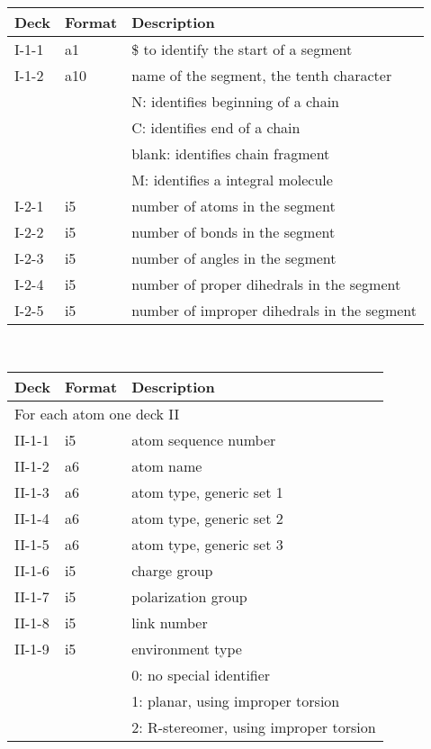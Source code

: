 \begin{center}
\begin{tabular*}{150mm}{p{12mm}p{12mm}l}
\hline\hline
Deck  & Format & Description \\ \hline
I-1-1 & a1     & \$ to identify the start of a segment \\
I-1-2 & a10    & name of the segment, the tenth character\\
      &        & N: identifies beginning of a chain\\
      &        & C: identifies end of a chain\\
      &        & blank: identifies chain fragment\\
      &        & M: identifies a integral molecule\\
I-2-1 & i5     & number of atoms in the segment\\
I-2-2 & i5     & number of bonds in the segment\\
I-2-3 & i5     & number of angles in the segment\\
I-2-4 & i5     & number of proper dihedrals in the segment\\
I-2-5 & i5     & number of improper dihedrals in the segment\\
\hline
\end{tabular*}\\
\begin{tabular*}{150mm}{p{12mm}p{12mm}l}
\hline\hline
Deck & Format & Description \\ \hline
\multicolumn{3}{l}{For each atom one deck II} \\
II-1-1 & i5     & atom sequence number \\
II-1-2 & a6     & atom name \\
II-1-3 & a6     & atom type, generic set 1 \\
II-1-4 & a6     & atom type, generic set 2 \\
II-1-5 & a6     & atom type, generic set 3 \\
II-1-6 & i5     & charge group\\
II-1-7 & i5     & polarization group\\
II-1-8 & i5     & link number\\
II-1-9 & i5     & environment type\\
       &        & 0: no special identifier\\
       &        & 1: planar, using improper torsion\\
       &        & 2: R-stereomer, using improper torsion\\

\end{tabular*}
\end{center}
